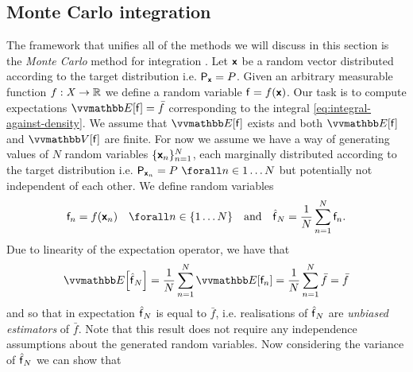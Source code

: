 \subsection{Monte Carlo integration}\label{subsec:monte-carlo-method}

The framework that unifies all of the methods we will discuss in this section is the \emph{Monte Carlo} method for integration \citep{ulam1949monte}. Let $\boldsymbol{\mathsf{x}}$ be a random vector distributed according to the target distribution i.e. $\mathsf{P}_{\boldsymbol{\mathsf{x}}} = P$. Given an arbitrary measurable function $f : \mathit{X} \to \mathbb{R}$ we define a random variable $\mathsf{f} = f(\boldsymbol{\mathsf{x}})$. Our task is to compute expectations $\expc{\rvar{f}} = \bar{f}$ corresponding to the integral \eqref{eq:integral-against-density}. We assume that $\expc{\rvar{f}}$ exists and both $\expc{\rvar{f}}$ and $\var{\rvar{f}}$ are finite. For now we assume we have a way of generating values of $N$ random variables $\lbrace \boldsymbol{\mathsf{x}}_n\rbrace_{n=1}^N$, each marginally distributed according to the target distribution i.e. $\prob{\rvct{x}_n} = \tgtprob ~\forall n \in 1 \dots N$ but potentially not independent of each other. We define random variables 
\begin{equation}
  \rvar{f}_n = f\lpa\rvct{x}_n\rpa \quad\forall n \in \fset{1\dots N}
  \quad\textrm{and}\quad
  \hatf_N = \frac{1}{N} \sum_{n=1}^N \rvar{f}_n.
\end{equation}
Due to linearity of the expectation operator, we have that
\begin{equation}
  \expc{\hatf_N} = 
  \frac{1}{N} \sum_{n=1}^N \expc{\rvar{f}_n} = 
  \frac{1}{N} \sum_{n=1}^N \bar{f} = 
  \bar{f}
\end{equation}
and so that in expectation $\hatf_N$ is equal to $\bar{f}$, i.e. realisations of $\hatf_N$ are \emph{unbiased estimators} of $\bar{f}$. Note that this result does not require any independence assumptions about the generated random variables. Now considering the variance of $\hatf_N$ we can show that
